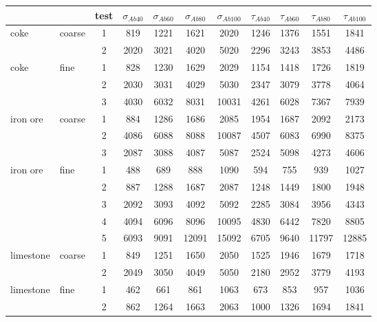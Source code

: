 \begin{table}%
\centering
\begin{tabular}{ll|c|cccc|cccc}
\hline
          &       & test  & $\sigma_{Ab40}$ & $\sigma_{Ab60}$ & $\sigma_{Ab80}$ &
          $\sigma_{Ab100}$ & $\tau_{Ab40}$ & $\tau_{Ab60}$ & $\tau_{Ab80}$ &
          $\tau_{Ab100}$ \\
\hline          
    coke  & coarse & 1     & 819   & 1221  & 1621  & 2020  & 1246  & 1376  & 1551  & 1841 \\
          &       & 2     & 2020  & 3021  & 4020  & 5020  & 2296  & 3243  & 3853  & 4486 \\
\hline
    coke  & fine  & 1     & 828   & 1230  & 1629  & 2029  & 1154  & 1418  & 1726  & 1819 \\
          &       & 2     & 2030  & 3031  & 4029  & 5030  & 2347  & 3079  & 3778  & 4064 \\
          &       & 3     & 4030  & 6032  & 8031  & 10031 & 4261  & 6028  & 7367  & 7939 \\
\hline
    iron ore & coarse & 1     & 884   & 1286  & 1686  & 2085  & 1954  & 1687  & 2092  & 2173 \\
          &       & 2     & 4086  & 6088  & 8088  & 10087 & 4507  & 6083  & 6990  & 8375 \\
          &       & 3     & 2087  & 3088  & 4087  & 5087  & 2524  & 5098  & 4273  & 4606 \\
\hline
    iron ore & fine  & 1     & 488   & 689   & 888   & 1090  & 594   & 755   & 939   & 1027 \\
          &       & 2     & 887   & 1288  & 1687  & 2087  & 1248  & 1449  & 1800  & 1948 \\
          &       & 3     & 2092  & 3093  & 4092  & 5092  & 2285  & 3084  & 3956  & 4343 \\
          &       & 4     & 4094  & 6096  & 8096  & 10095 & 4830  & 6442  & 7820  & 8805 \\
          &       & 5     & 6093  & 9091  & 12091 & 15092 & 6705  & 9640  & 11797 & 12885 \\
\hline
    limestone & coarse & 1     & 849   & 1251  & 1650  & 2050  & 1525  & 1946  & 1679  & 1718 \\
          &       & 2     & 2049  & 3050  & 4049  & 5050  & 2180  & 2952  & 3779  & 4193 \\
\hline
    limestone & fine  & 1     & 462   & 661   & 861   & 1063  & 673   & 853   & 957   & 1036 \\
          &       & 2     & 862   & 1264  & 1663  & 2063  & 1000  & 1326  & 1694  & 1841 \\

\end{tabular}
\end{table}
